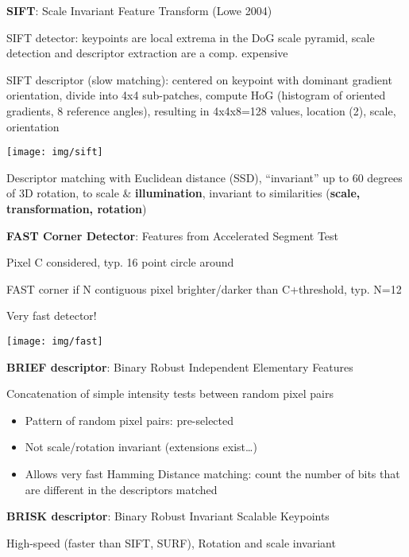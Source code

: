 \documentclass[fontsize=6pt]{scrartcl}
\begin{document}
\begin{multicols*}{4}
\textbf{SIFT}: Scale Invariant Feature Transform (Lowe 2004)

SIFT detector: keypoints are local extrema in the DoG scale pyramid, scale detection and descriptor extraction are a comp. expensive

\begin{minipage}{0.6\linewidth}
	SIFT descriptor  (slow matching): centered on keypoint with	dominant gradient orientation, divide into 4x4 sub-patches, compute HoG (histogram of oriented gradients, 8 reference angles), resulting in 4x4x8=128 values, location (2), scale, orientation
\end{minipage}
\begin{minipage}{0.40\linewidth}
	\texttt{[image: img/sift]}
\end{minipage}
Descriptor matching with Euclidean distance (SSD), \enquote{invariant} up to 60 degrees of 3D rotation, to scale \& \textbf{illumination}, invariant to similarities (\textbf{scale, transformation, rotation})

\begin{minipage}{0.77\linewidth}
	\textbf{FAST Corner Detector}: Features from Accelerated Segment Test

	Pixel C considered, typ. 16 point circle around

	FAST corner if N contiguous pixel brighter/darker than C+threshold, typ. N=12

	Very fast detector!
\end{minipage}
\begin{minipage}{0.22\linewidth}
	\texttt{[image: img/fast]}
\end{minipage}

\textbf{BRIEF descriptor}: Binary Robust Independent Elementary Features

Concatenation of simple intensity tests between random pixel pairs

\begin{itemize}
	\item Pattern of random pixel pairs: pre-selected
	\item Not scale/rotation invariant (extensions exist…)
	\item Allows very fast Hamming Distance matching:
	count the number of bits that are different in the descriptors matched
\end{itemize}

\textbf{BRISK descriptor}: Binary Robust Invariant Scalable Keypoints

High-speed (faster than SIFT, SURF), Rotation and scale invariant


\end{multicols*}
\end{document}
